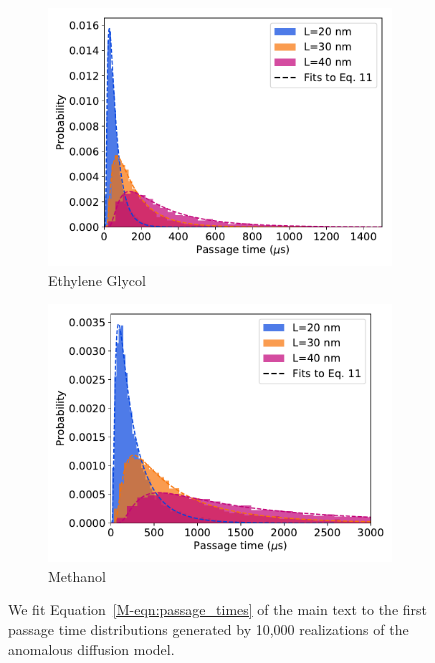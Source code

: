 \documentclass{article}
\begin{document}
\begin{figure}[h]
\begin{subfigure}{0.45\textwidth}
  \includegraphics[width=\textwidth]{ad_fpt_distributions_GCL.pdf}
  \caption{Ethylene Glycol}\label{fig:GCL_ad_fpt_distributions}
  \end{subfigure}
  \begin{subfigure}{0.45\textwidth}
  \includegraphics[width=\textwidth]{ad_fpt_distributions_MET.pdf}
  \caption{Methanol}\label{fig:MET_ad_fpt_distributions}
  \end{subfigure}
  \caption{We fit Equation~\ref{M-eqn:passage_times} of the main text to the
  first passage time distributions generated by 10,000 realizations of the 
  anomalous diffusion model. }\label{fig:ad_fpt_fits}
  \end{figure}
  
\end{document}
